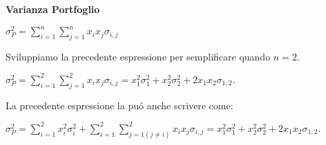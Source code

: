 \documentclass[12pt]{article}
\begin{document}
%


\thispagestyle{empty}

\begin{center}
\large

\textbf{Varianza Portfoglio}\\[1pt] 



\end{center}

$\displaystyle \sigma^2_P=\sum_{i=1}^n\sum_{j=1}^nx_ix_j\sigma_{i,j}$


Sviluppiamo la precedente espressione per semplificare quando $n=2$.


$\displaystyle \sigma^2_P=\sum_{i=1}^2\sum_{j=1}^2 x_ix_j\sigma_{i,j}=x_1^2\sigma_1^2+x_2^2\sigma_2^2+2x_1x_2\sigma_{1,2}.$

La precedente espressione la pu\'o anche scrivere come:


$\displaystyle \sigma^2_P=\sum_{i=1}^2x^2_i\sigma^2_i+\sum_{i=1}^2\sum_{j=1(j\neq i)}^2 x_ix_j\sigma_{i,j}=x_1^2\sigma_1^2+x_2^2\sigma_2^2+2x_1x_2\sigma_{1,2}.$
\end{document}
